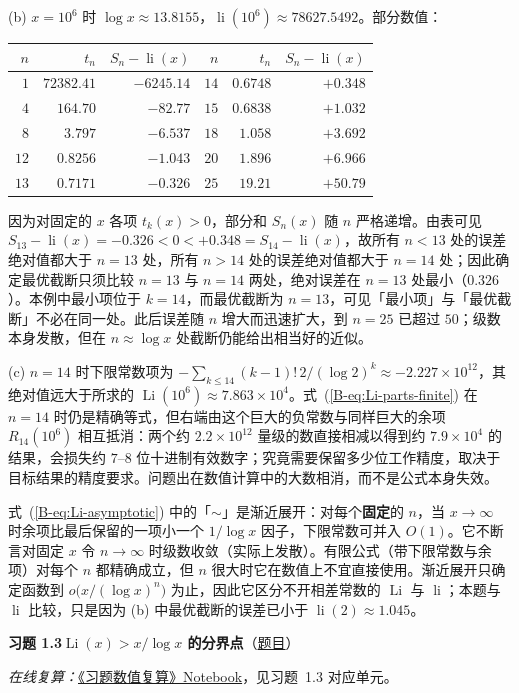 \documentclass[11pt,a4paper]{article}
\DeclareMathOperator{\Li}{Li}
\DeclareMathOperator{\li}{li}
\newcommand{\bref}[1]{\ref*{B-#1}}
\newcommand{\Sol}[2]{%
  \par\addvspace{1.2em}\noindent
  \hypertarget{s:#1}{}\textbf{习题 #1\quad #2}\hfill{\small（\hyperlink{q:#1}{题目}）}\par
  \nopagebreak\smallskip}
\begin{document}
(b) $x=10^6$ 时 $\log x\approx13.8155$，$\li(10^6)\approx78627.5492$。部分数值：
\begin{center}
\begin{tabular}{rrr|rrr}
\toprule
$n$ & $t_n$ & $S_n-\li(x)$ & $n$ & $t_n$ & $S_n-\li(x)$\\
\midrule
$1$ & $72382.41$ & $-6245.14$ & $14$ & $0.6748$ & $+0.348$\\
$4$ & $164.70$ & $-82.77$ & $15$ & $0.6838$ & $+1.032$\\
$8$ & $3.797$ & $-6.537$ & $18$ & $1.058$ & $+3.692$\\
$12$ & $0.8256$ & $-1.043$ & $20$ & $1.896$ & $+6.966$\\
$13$ & $0.7171$ & $-0.326$ & $25$ & $19.21$ & $+50.79$\\
\bottomrule
\end{tabular}
\end{center}
因为对固定的 $x$ 各项 $t_k(x)>0$，部分和 $S_n(x)$ 随 $n$ 严格递增。由表可见 $S_{13}-\li(x)=-0.326<0<+0.348=S_{14}-\li(x)$，故所有 $n<13$ 处的误差绝对值都大于 $n=13$ 处，所有 $n>14$ 处的误差绝对值都大于 $n=14$ 处；因此确定最优截断只须比较 $n=13$ 与 $n=14$ 两处，绝对误差在 $n=13$ 处最小（$0.326$）。本例中最小项位于 $k=14$，而最优截断为 $n=13$，可见「最小项」与「最优截断」不必在同一处。此后误差随 $n$ 增大而迅速扩大，到 $n=25$ 已超过 $50$；级数本身发散，但在 $n\approx\log x$ 处截断仍能给出相当好的近似。

(c) $n=14$ 时下限常数项为 $-\sum_{k\le14}(k-1)!\,2/(\log2)^k\approx-2.227\times10^{12}$，其绝对值远大于所求的 $\Li(10^6)\approx7.863\times10^4$。式~(\bref{eq:Li-parts-finite}) 在 $n=14$ 时仍是精确等式，但右端由这个巨大的负常数与同样巨大的余项 $R_{14}(10^6)$ 相互抵消：两个约 $2.2\times10^{12}$ 量级的数直接相减以得到约 $7.9\times10^4$ 的结果，会损失约 $7$--$8$ 位十进制有效数字；究竟需要保留多少位工作精度，取决于目标结果的精度要求。问题出在数值计算中的大数相消，而不是公式本身失效。

式~(\bref{eq:Li-asymptotic}) 中的「$\sim$」是渐近展开：对每个\textbf{固定}的 $n$，当 $x\to\infty$ 时余项比最后保留的一项小一个 $1/\log x$ 因子，下限常数可并入 $O(1)$。它不断言对固定 $x$ 令 $n\to\infty$ 时级数收敛（实际上发散）。有限公式（带下限常数与余项）对每个 $n$ 都精确成立，但 $n$ 很大时它在数值上不宜直接使用。渐近展开只确定函数到 $o\bigl(x/(\log x)^n\bigr)$ 为止，因此它区分不开相差常数的 $\Li$ 与 $\li$；本题与 $\li$ 比较，只是因为 (b) 中最优截断的误差已小于 $\li(2)\approx1.045$。

\Sol{1.3}{$\Li(x)>x/\log x$ 的分界点}
\emph{在线复算：}\href{https://colab.research.google.com/github/lichengtong123/lichengtong-RH/blob/main/\%E4\%B9\%A0\%E9\%A2\%98\%E4\%B8\%8E\%E8\%A7\%A3\%E7\%AD\%94/\%E4\%B9\%A0\%E9\%A2\%98\%E6\%95\%B0\%E5\%80\%BC\%E5\%A4\%8D\%E7\%AE\%97.ipynb}{《习题数值复算》Notebook}，见习题~1.3 对应单元。
\end{document}

